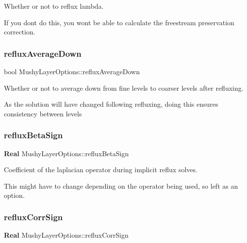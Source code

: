 Whether or not to reflux lambda. 

If you don\textquotesingle{}t do this, you won\textquotesingle{}t be able to calculate the freestream preservation correction. \mbox{\label{struct_mushy_layer_options_a5f49a32e621d8c69bf2c6dae577b5db2}} 
\subsubsection{\texorpdfstring{reflux\+Average\+Down}{refluxAverageDown}}
{\footnotesize\ttfamily bool Mushy\+Layer\+Options\+::reflux\+Average\+Down}



Whether or not to average down from fine levels to coarser levels after refluxing. 

As the solution will have changed following refluxing, doing this ensures consistency between levels \mbox{\label{struct_mushy_layer_options_a8cf08767319ec63a4b6a0cf3f634cc81}} 
\subsubsection{\texorpdfstring{reflux\+Beta\+Sign}{refluxBetaSign}}
{\footnotesize\ttfamily \textbf{ Real} Mushy\+Layer\+Options\+::reflux\+Beta\+Sign}



Coefficient of the laplacian operator during implicit reflux solves. 

This might have to change depending on the operator being used, so left as an option. \mbox{\label{struct_mushy_layer_options_aa978db9bd7ffd2f72f72614f1cc2e769}} 
\subsubsection{\texorpdfstring{reflux\+Corr\+Sign}{refluxCorrSign}}
{\footnotesize\ttfamily \textbf{ Real} Mushy\+Layer\+Options\+::reflux\+Corr\+Sign}



